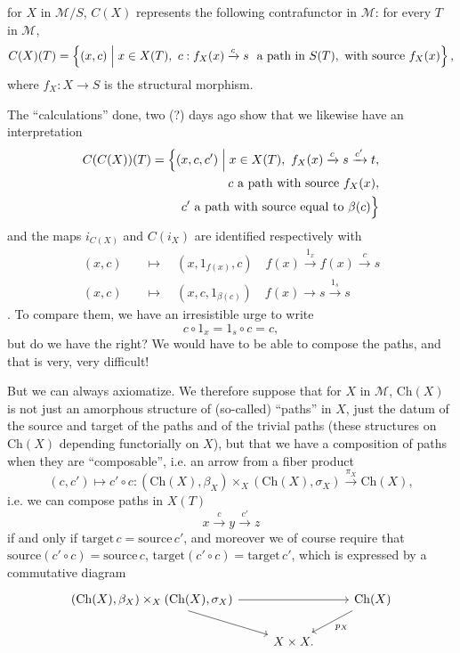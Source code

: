 \documentclass[11pt]{article}
\newcommand{\msp}[1]{\marginpar{\footnotesize [#1]}}
\newcommand{\Ch}{\mathrm{Ch}}
\begin{document}
\msp{page 105}
for $X$ in $\mathcal{M}/S$, $C(X)$ represents the following contrafunctor in $\mathcal{M}$: for every $T$ in $\mathcal{M}$,
\[
C(X)(T)=\Bigl\{(x,c)\Bigm| x\in X(T),\ c : f_X(x)\xrightarrow{c}s\ \text{ a path in } S(T), \text{ with source } f_X(x)\Bigr\}\,,
\]
where $f_X : X\longrightarrow S$ is the structural morphism.

The ``calculations'' done, two (?) days ago show that we likewise have an interpretation
\[
\begin{aligned}
C(C(X))(T)=\Bigl\{(x,c,c')\Bigm| x\in X(T),\ f_X(x)\xrightarrow{c}s\xrightarrow{c'}t,\\
c\text{ a path with source } f_X(x),\\
c'\text{ a path with source equal to } \beta(c)\Bigr\}
\end{aligned}
\]
and the maps $i_{C(X)}$ and $C(i_X)$ are identified respectively with
\[
\begin{aligned}
(x,c)\quad&\longmapsto\quad(x,1_{f(x)},c)\quad f(x)\xrightarrow{1_x}f(x)\xrightarrow{c}s\\
(x,c)\quad&\longmapsto\quad(x,c,1_{\beta(c)})\quad f(x)\longrightarrow s\xrightarrow{1_s}s
\end{aligned}
\]
. To compare them, we have an irresistible urge to write
\[
c\circ 1_x=1_s\circ c=c,
\]
but do we have the right? We would have to be able to compose the paths, and that is very, very difficult!

But we can always axiomatize. We therefore suppose that for $X$ in $\mathcal{M}$, $\Ch(X)$
\msp{page 106}
is not just an amorphous structure of (so-called) ``paths'' in $X$, just the datum of the source and target of the paths and of the trivial paths (these structures on $\Ch(X)$ depending functorially on $X$), but that we have a composition of paths when they are ``composable'', i.e. an arrow from a fiber product
\[
(c,c')\longmapsto c'\circ c : (\Ch(X),\beta_X)\times_X(\Ch(X),\sigma_X)\xrightarrow{\pi_X}\Ch(X),
\]
i.e. we can compose paths in $X(T)$
\[
x\xrightarrow{c}y\xrightarrow{c'}z
\]
if and only if $\text{target}\,c=\text{source}\,c'$, and moreover we of course require that $\text{source}(c'\circ c)=\text{source}\,c$, $\text{target}(c'\circ c)=\text{target}\,c'$, which is expressed by a commutative diagram
\[
\begin{tikzcd}
(\Ch(X),\beta_X)\times_X(\Ch(X),\sigma_X) \arrow[rr] \arrow[dr] & & \Ch(X) \arrow[dl, "p_X"] \\
 & X\times X. &
\end{tikzcd}
\]
\end{document}
